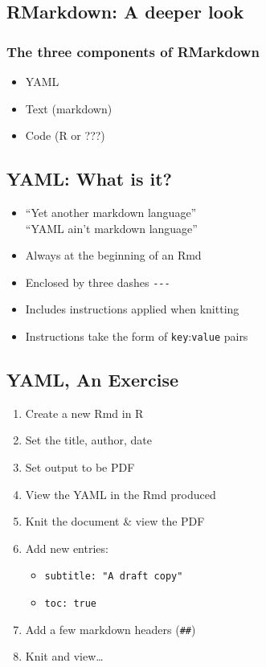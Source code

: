 \documentclass[
]{article}
\providecommand{\tightlist}{%
  \setlength{\itemsep}{0pt}\setlength{\parskip}{0pt}}
\begin{document}
\subsection{RMarkdown: A deeper look}\label{rmarkdown-a-deeper-look}

\subsubsection{The three components of
RMarkdown}\label{the-three-components-of-rmarkdown}

\begin{itemize}
\tightlist
\item
  YAML
\item
  Text (markdown)
\item
  Code (R or ???)
\end{itemize}

\subsection{YAML: What is it?}\label{yaml-what-is-it}

\begin{itemize}
\tightlist
\item
  ``Yet another markdown language''\\
  ``YAML ain't markdown language''
\item
  Always at the beginning of an Rmd
\item
  Enclosed by three dashes \texttt{-\/-\/-}
\item
  Includes instructions applied when knitting
\item
  Instructions take the form of \texttt{key}:\texttt{value} pairs
\end{itemize}

\subsection{YAML, An Exercise}\label{yaml-an-exercise}

\begin{enumerate}
\def\labelenumi{\arabic{enumi}.}
\tightlist
\item
  Create a new Rmd in R
\item
  Set the title, author, date
\item
  Set output to be PDF
\item
  View the YAML in the Rmd produced
\item
  Knit the document \& view the PDF
\item
  Add new entries:

  \begin{itemize}
  \tightlist
  \item
    \texttt{subtitle:\ "A\ draft\ copy"}
  \item
    \texttt{toc:\ true}
  \end{itemize}
\item
  Add a few markdown headers (\texttt{\#\#})
\item
  Knit and view\ldots{}
\end{enumerate}
\end{document}
